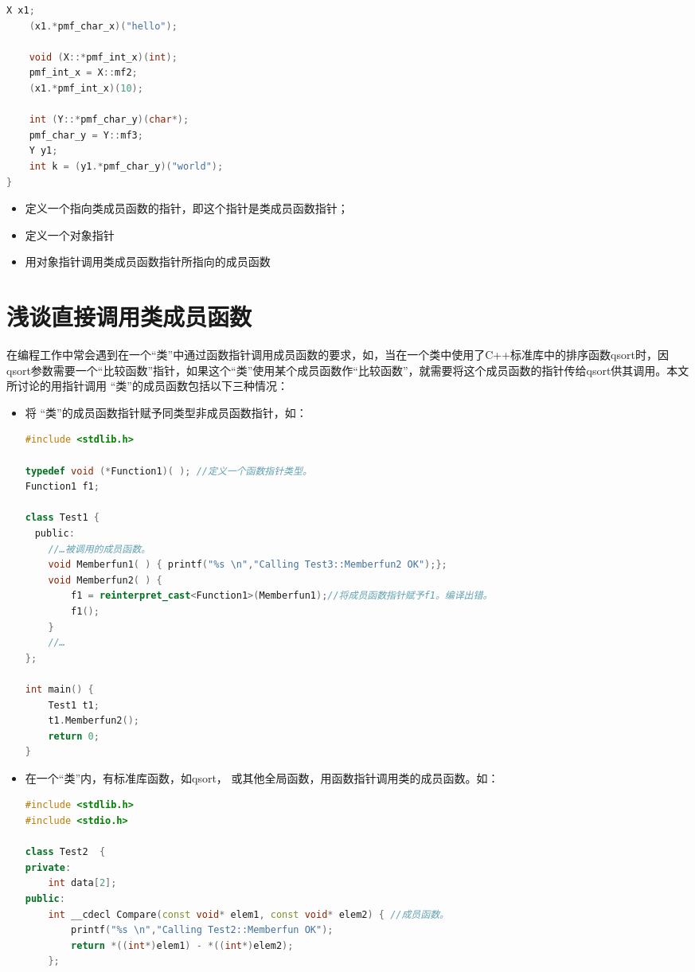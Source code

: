 \documentclass{article}
\begin{document}
\begin{CJK}{UTF8}{gbsn}
\begin{lstlisting}[language=c++]
    X x1;
    (x1.*pmf_char_x)("hello");

    void (X::*pmf_int_x)(int);
    pmf_int_x = X::mf2;
    (x1.*pmf_int_x)(10);

    int (Y::*pmf_char_y)(char*);
    pmf_char_y = Y::mf3;
    Y y1;
    int k = (y1.*pmf_char_y)("world");
}
\end{lstlisting}
\begin{itemize}
  \itemsep=-3pt
\item 定义一个指向类成员函数的指针，即这个指针是类成员函数指针；
\item 定义一个对象指针 
\item 用对象指针调用类成员函数指针所指向的成员函数
\end{itemize}

\section{浅谈直接调用类成员函数}
在编程工作中常会遇到在一个“类”中通过函数指针调用成员函数的要求，如，当在一个类中使用了C++标准库中的排序函数qsort时，因qsort参数需要一个“比较函数”指针，如果这个“类”使用某个成员函数作“比较函数”，就需要将这个成员函数的指针传给qsort供其调用。本文所讨论的用指针调用 “类”的成员函数包括以下三种情况：
\begin{itemize}
  \itemsep=-3pt
\item 将 “类”的成员函数指针赋予同类型非成员函数指针，如：
\begin{lstlisting}[language=c++]
#include <stdlib.h>

typedef void (*Function1)( ); //定义一个函数指针类型。
Function1 f1;

class Test1 {  
　public:   
    //…被调用的成员函数。  
    void Memberfun1( ) { printf("%s \n","Calling Test3::Memberfun2 OK");};   
    void Memberfun2( ) {      
        f1 = reinterpret_cast<Function1>(Memberfun1);//将成员函数指针赋予f1。编译出错。  
        f1();  
    }  
    //…  
};

int main() {  
    Test1 t1;  
    t1.Memberfun2();  
    return 0;  
} 
\end{lstlisting}

\item 在一个“类”内，有标准库函数，如qsort， 或其他全局函数，用函数指针调用类的成员函数。如：
\begin{lstlisting}[language=c++]
#include <stdlib.h>
#include <stdio.h>

class Test2  {  
private:   
    int data[2];   
public:  
    int __cdecl Compare(const void* elem1, const void* elem2) { //成员函数。  
        printf("%s \n","Calling Test2::Memberfun OK");  
        return *((int*)elem1) - *((int*)elem2);   
    };


\end{lstlisting}
\end{itemize}
\end{CJK}
\end{document}
